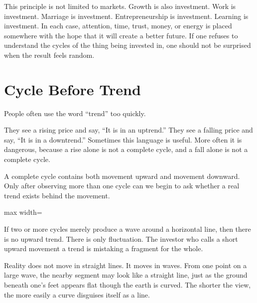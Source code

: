 This principle is not limited to markets. Growth is also investment. Work is investment. Marriage is investment. Entrepreneurship is investment. Learning is investment. In each case, attention, time, trust, money, or energy is placed somewhere with the hope that it will create a better future. If one refuses to understand the cycles of the thing being invested in, one should not be surprised when the result feels random.

\section*{Cycle Before Trend}

People often use the word ``trend'' too quickly.

They see a rising price and say, ``It is in an uptrend.'' They see a falling price and say, ``It is in a downtrend.'' Sometimes this language is useful. More often it is dangerous, because a rise alone is not a complete cycle, and a fall alone is not a complete cycle.

A complete cycle contains both movement upward and movement downward. Only after observing more than one cycle can we begin to ask whether a real trend exists behind the movement.

\begin{center}
\begin{adjustbox}{max width=\linewidth}
\end{adjustbox}
\end{center}

If two or more cycles merely produce a wave around a horizontal line, then there is no upward trend. There is only fluctuation. The investor who calls a short upward movement a trend is mistaking a fragment for the whole.

Reality does not move in straight lines. It moves in waves. From one point on a large wave, the nearby segment may look like a straight line, just as the ground beneath one's feet appears flat though the earth is curved. The shorter the view, the more easily a curve disguises itself as a line.

